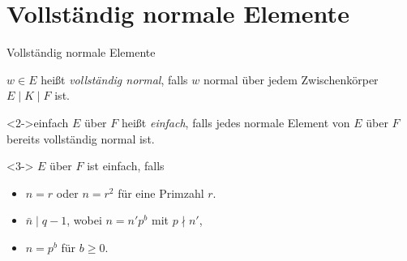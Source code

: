 \documentclass{vorlage}
\begin{document}



\section{Vollständig normale Elemente}

\secframe


\begin{frame}{Vollständig normale Elemente}
  \begin{definition}
    $w\in E$ heißt \emph{vollständig normal}, falls $w$ normal über jedem
    Zwischenkörper $E \mid K\mid F$ ist.
  \end{definition}
  \begin{definition}<2->{einfach}
    $E$ über $F$ heißt \emph{einfach}, falls jedes normale Element von $E$ über
    $F$ bereits vollständig normal ist.
  \end{definition}
  \begin{satz}<3->
    $E$ über $F$ ist einfach, falls
    \begin{itemize}
      \item $n = r$ oder $n=r^2$ für eine Primzahl $r$.
      \item $\bar n \mid q-1$, wobei 
        $n = n'p^b$ mit $p\nmid n'$,
      \item $n = p^b$ für $b\geq 0$.
    \end{itemize}
  \end{satz}
\end{frame}
\end{document}
